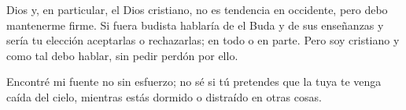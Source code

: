 Dios y, en particular, el Dios cristiano, no es tendencia en occidente, pero debo mantenerme firme. Si fuera budista hablaría de el Buda y de sus enseñanzas y sería tu elección aceptarlas o rechazarlas; en todo o en parte. Pero soy cristiano y como tal debo hablar, sin pedir perdón por ello.

Encontré mi fuente no sin esfuerzo; no sé si tú pretendes que la tuya te venga caída del cielo, mientras estás dormido o distraído en otras cosas.